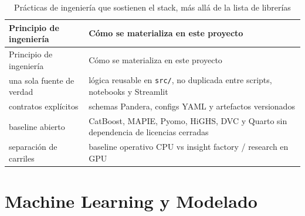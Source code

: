 \documentclass[
  spanish,
  11pt,
  letterpaper,
]{scrbook}
\theoremstyle{plain}
\theoremstyle{remark}
\begin{document}
\begin{longtable}[]{@{}
  >{\raggedright\arraybackslash}p{}
  >{\raggedright\arraybackslash}p{}@{}}
\caption{Prácticas de ingeniería que sostienen el stack, más allá de la
lista de
librerías}\label{tbl-stack-engineering-principles}\tabularnewline
\toprule\noalign{}
\begin{minipage}[b]{\linewidth}\raggedright
Principio de ingeniería
\end{minipage} & \begin{minipage}[b]{\linewidth}\raggedright
Cómo se materializa en este proyecto
\end{minipage} \\
\midrule\noalign{}
\endfirsthead
\toprule\noalign{}
\begin{minipage}[b]{\linewidth}\raggedright
Principio de ingeniería
\end{minipage} & \begin{minipage}[b]{\linewidth}\raggedright
Cómo se materializa en este proyecto
\end{minipage} \\
\midrule\noalign{}
\endhead
\bottomrule\noalign{}
\endlastfoot
una sola fuente de verdad & lógica reusable en \texttt{src/}, no
duplicada entre scripts, notebooks y Streamlit \\
contratos explícitos & schemas Pandera, configs YAML y artefactos
versionados \\
baseline abierto & CatBoost, MAPIE, Pyomo, HiGHS, DVC y Quarto sin
dependencia de licencias cerradas \\
separación de carriles & baseline operativo CPU vs insight factory /
research en GPU \\
\end{longtable}

\section{Machine Learning y Modelado}\label{machine-learning-y-modelado}
\end{document}
